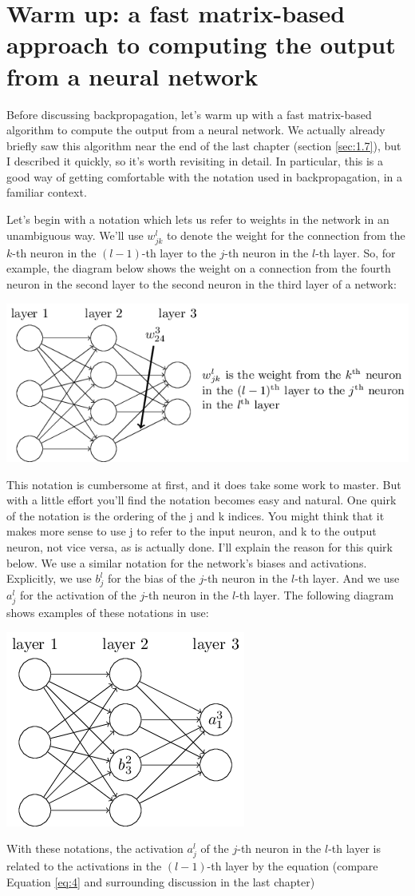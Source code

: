 \documentclass[a4paper,twoside,10pt]{book}
\begin{document}
\section{Warm up: a fast matrix-based approach to computing the output from a neural network}
Before discussing backpropagation, let's warm up with a fast matrix-based algorithm to compute the output from a neural network. We actually already briefly saw this algorithm near the end of the last chapter (section \ref{sec:1.7}), but I described it quickly, so it's worth revisiting in detail. In particular, this is a good way of getting comfortable with the notation used in backpropagation, in a familiar context.

Let's begin with a notation which lets us refer to weights in the network in an unambiguous way. We'll use $w^l_{jk}$ to denote the weight for the connection from the $k$-th neuron in the $(l-1)$-th layer to the $j$-th neuron in the $l$-th layer. So, for example, the diagram below shows the weight on a connection from the fourth neuron in the second layer to the second neuron in the third layer of a network:

\begin{center}
	\includegraphics[width=0.7\linewidth]{./figures/ch2/tikz16}
\end{center}
This notation is cumbersome at first, and it does take some work to master. But with a little effort you'll find the notation becomes easy and natural. One quirk of the notation is the ordering of the j and k indices. You might think that it makes more sense to use j to refer to the input neuron, and k to the output neuron, not vice versa, as is actually done. I'll explain the reason for this quirk below.
We use a similar notation for the network's biases and activations. Explicitly, we use $b^l_j$ for the bias of the $j$-th neuron in the $l$-th layer. And we use $a^l_j$ for the activation of the $j$-th neuron in the $l$-th layer. The following diagram shows examples of these notations in use:
\begin{center}
\includegraphics[width=0.45\linewidth]{./figures/ch2/tikz17}
\end{center}
With these notations, the activation $a^l_j$ of the $j$-th neuron in the $l$-th layer is related to the activations in the $(l-1)$-th layer by the equation (compare Equation \ref{eq:4} and surrounding discussion in the last chapter)
\end{document}
